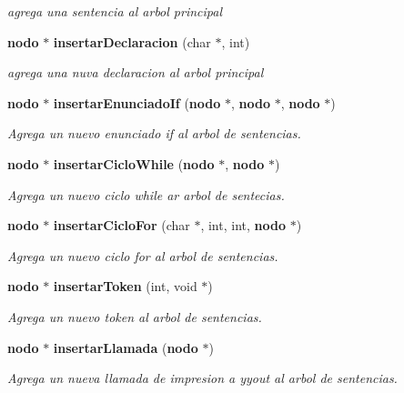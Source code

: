 \begin{CompactItemize}
\begin{CompactList}\small\item\em agrega una sentencia al arbol principal \item\end{CompactList}\item 
{\bf nodo} $\ast$ {\bf insertar\-Declaracion} (char $\ast$, int)
\begin{CompactList}\small\item\em agrega una nuva declaracion al arbol principal \item\end{CompactList}\item 
{\bf nodo} $\ast$ {\bf insertar\-Enunciado\-If} ({\bf nodo} $\ast$, {\bf nodo} $\ast$, {\bf nodo} $\ast$)
\begin{CompactList}\small\item\em Agrega un nuevo enunciado if al arbol de sentencias. \item\end{CompactList}\item 
{\bf nodo} $\ast$ {\bf insertar\-Ciclo\-While} ({\bf nodo} $\ast$, {\bf nodo} $\ast$)
\begin{CompactList}\small\item\em Agrega un nuevo ciclo while ar arbol de sentecias. \item\end{CompactList}\item 
{\bf nodo} $\ast$ {\bf insertar\-Ciclo\-For} (char $\ast$, int, int, {\bf nodo} $\ast$)
\begin{CompactList}\small\item\em Agrega un nuevo ciclo for al arbol de sentencias. \item\end{CompactList}\item 
{\bf nodo} $\ast$ {\bf insertar\-Token} (int, void $\ast$)
\begin{CompactList}\small\item\em Agrega un nuevo token al arbol de sentencias. \item\end{CompactList}\item 
{\bf nodo} $\ast$ {\bf insertar\-Llamada} ({\bf nodo} $\ast$)
\begin{CompactList}\small\item\em Agrega un nueva llamada de impresion a yyout al arbol de sentencias. \item\end{CompactList}\item 

\end{CompactItemize}
